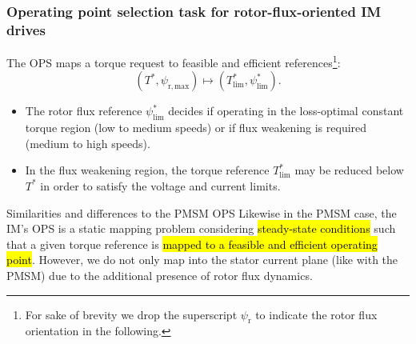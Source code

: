 \begin{frame}
    \frametitle{Operating point selection task for rotor-flux-oriented IM drives}
    The OPS maps a torque request to feasible and efficient references\footnote{For sake of brevity we drop the superscript $\psi_\mathrm{r}$ to indicate the rotor flux orientation in the following.}:
    \begin{equation}
        \left(T^*, \psi_\mathrm{r,max}\right)
        \mapsto
        \left(T^*_\mathrm{lim}, \psi^*_\mathrm{lim}\right).
        \label{eq:IM_OPS_mapping_v14}
    \end{equation}\pause%
    \begin{itemize}
        \item The rotor flux reference $\psi^*_\mathrm{lim}$ decides if operating in the loss-optimal constant torque region (low to medium speeds) or if flux weakening is required (medium to high speeds).\pause%
        \item In the flux weakening region, the torque reference $T^*_\mathrm{lim}$ may be reduced below $T^*$ in order to satisfy the voltage and current limits.\pause%
    \end{itemize}\vspace{-0.25cm}
    \begin{varblock}{Similarities and differences to the PMSM OPS}
        Likewise in the PMSM case, the IM's OPS is a static mapping problem considering \hl{steady-state conditions} such that a given torque reference is \hl{mapped to a feasible and efficient operating point}. However, we do not only map into the stator current plane (like with the PMSM) due to the additional presence of rotor flux dynamics.
    \end{varblock}
\end{frame}

